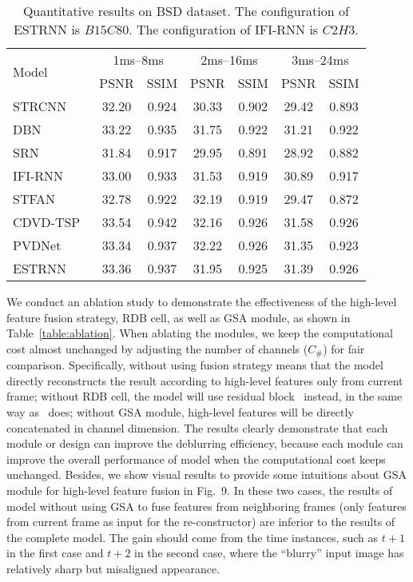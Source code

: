 \documentclass[twocolumn]{svjour3}          \smartqed  \usepackage{graphicx}
\begin{document}
\begin{table*}[t]
	\caption{Quantitative results on BSD dataset. The configuration of ESTRNN is $B15C80$. The configuration of IFI-RNN is $C2H3$.}
	\label{table:bsd}
	\centering
\setlength{\tabcolsep}{14pt}
	\begin{tabular}{lcccccc}
		\toprule
		\multirow{2}{*}{Model}&\multicolumn{2}{c}{1ms--8ms}&\multicolumn{2}{c}{2ms--16ms}&\multicolumn{2}{c}{3ms--24ms}\\
		& PSNR & SSIM & PSNR & SSIM & PSNR & SSIM\\
		\midrule
		STRCNN~\cite{hyun2017online} &32.20&  0.924&  30.33& 0.902& 29.42& 0.893 \\
		DBN~\cite{su2017deep} &33.22& 0.935& 31.75& 0.922& 31.21& 0.922 \\
		SRN~\cite{tao2018scale} &31.84  &0.917  &29.95 &0.891 & 28.92& 0.882\\
		IFI-RNN~\cite{nah2019recurrent} & 33.00&  0.933&  31.53& 0.919& 30.89& 0.917\\
		STFAN~\cite{zhou2019spatio} & 32.78 &  0.922&  32.19& 0.919& 29.47&0.872\\
		CDVD-TSP~\cite{pan2020cascaded} & 33.54& 0.942&  32.16&0.926 & 31.58&0.926\\
	    PVDNet~\cite{son2021recurrent} & 33.34&0.937&  32.22&0.926& 31.35&0.923\\
		ESTRNN &  33.36& 0.937&  31.95& 0.925& 31.39& 0.926\\
		\bottomrule
	\end{tabular}
\end{table*}

We conduct an ablation study to demonstrate the effectiveness of the high-level feature fusion strategy, RDB cell, as well as GSA module, as shown in Table~\ref{table:ablation}. When ablating the modules, we keep the computational cost almost unchanged by adjusting the number of channels ($C_{\#}$) for fair comparison. Specifically, without using fusion strategy means that the model directly reconstructs the result according to high-level features only from current frame; without RDB cell, the model will use residual block~\cite{he2016deep} instead, in the same way as~\cite{nah2017deep} does; without GSA module, high-level features will be directly concatenated in channel dimension. The results clearly demonstrate that each module or design can improve the deblurring efficiency, because each module can improve the overall performance of model when the computational cost keeps unchanged. Besides, we show visual results to provide some intuitions about GSA module for high-level feature fusion in Fig.~9. In these two cases, the results of model without using GSA to fuse features from neighboring frames (only features from current frame as input for the re-constructor) are inferior to the results of the complete model. The gain should come from the time instances, such as $t+1$ in the first case and $t+2$ in the second case, where the ``blurry'' input image has relatively sharp but misaligned appearance.
\end{document}
